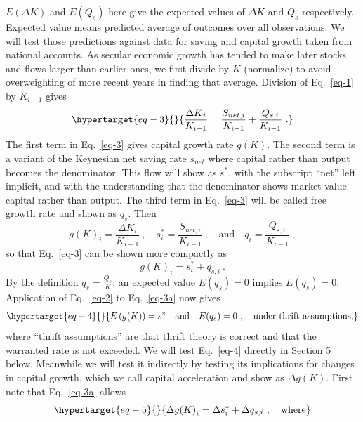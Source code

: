\(E(\Delta K)\) and \(E(Q_{s})\) here give the expected values of \(\Delta K\)
and \(Q_{s}\) respectively. Expected value means predicted average of outcomes
over all observations.
We will test those predictions against data for saving and capital growth taken from national accounts.
As secular economic growth has tended to make
later stocks and flows larger than earlier ones, we first divide by
\(K\) (normalize) to avoid overweighting of more recent years in finding
that average. Division of Eq.~\eqref{eq-1} by \(K_{i - 1}\) gives
%
\begin{equation}\protect\hypertarget{eq-3}{}{\frac{{\Delta K}_{i}}{K_{i - 1}} = \frac{S_{net,i}}{K_{i - 1}} + \frac{Q_{s,i}}{K_{i - 1}} \ .}\label{eq-3}\end{equation}
%
The first term in Eq.~\eqref{eq-3} gives capital growth rate \(g(K)\). The second term is a
variant of the Keynesian net saving rate \(s_{net}\) where capital
rather than output becomes the denominator. This flow will show 
as \(s^{*}\), with the subscript ``net''
left implicit, and with the understanding that the denominator shows
market-value capital rather than output.
The third term in Eq.~\eqref{eq-3} will be called free growth rate and
shown as \(q_s\). Then
%
\[g{(K)}_{i} = \frac{\Delta K_{i}}{K_{i - 1}} \ , \quad
s^{*}_{i} = \frac{S_{net,i}}{K_{i - 1}} \ , \quad \text{and} \quad
q_{i} = \frac{Q_{s,i}}{K_{i - 1}} \ ,\]
%
so that Eq.~\eqref{eq-3} can be shown more compactly as
%
\begin{equation}
g(K)_{i} = s^{*}_{i} + q_{s,i} \ .\label{eq-3a}
\end{equation}
%
By the definition \(q_s = \frac{Q_{s}}{K}\), an expected value \(E(q_s) = 0\)
implies \(E\left( q_s\right) = 0\). Application of Eq.~\eqref{eq-2} to
Eq.~\eqref{eq-3a} now gives
%
\begin{equation}\protect\hypertarget{eq-4}{}{E\left( g(K) \right) = s^{*} \quad \text{and} \quad E(q_s) = 0 \ , \quad \text{under thrift assumptions,}}\label{eq-4}\end{equation}
%
where ``thrift assumptions'' are that thrift theory is correct and that
the warranted rate is not exceeded. We will test Eq.~\eqref{eq-4} directly in Section 5 below. Meanwhile we will test it indirectly by testing its implications for changes in capital growth, which we call capital acceleration and show as $\Delta g(K)$. First note that Eq.~\eqref{eq-3a} allows
%
\begin{equation}\protect\hypertarget{eq-5}{}{\Delta g{(K)}_{i} = \Delta s^{*}_{i} + \Delta q_{s,i}\ , \quad \text{where}}\label{eq-5}\end{equation}
